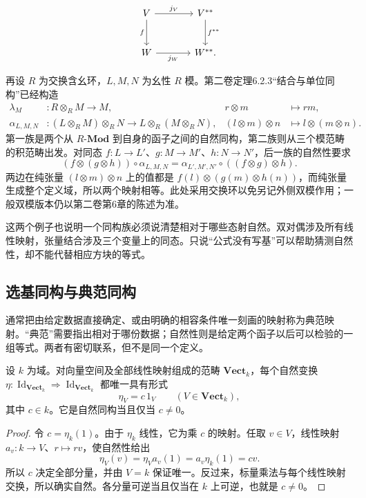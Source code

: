 \[
	\begin{tikzcd}[column sep=large,row sep=large]
		V\arrow[r,"j_V"]\arrow[d,"f"']&V^{**}\arrow[d,"f^{**}"]\\
		W\arrow[r,"j_W"']&W^{**}.
	\end{tikzcd}
\]

再设 \(R\) 为交换含幺环，\(L,M,N\) 为幺性 \(R\) 模。第二卷定理6.2.3“结合与单位同构”已经构造
\[
	\begin{aligned}
		\lambda_M &:R\otimes_RM\longrightarrow M, &r\otimes m&\longmapsto rm,\\
		\alpha_{L,M,N}&:(L\otimes_RM)\otimes_RN \longrightarrow L\otimes_R(M\otimes_RN), &(l\otimes m)\otimes n&\longmapsto l\otimes(m\otimes n).
	\end{aligned}
\]
第一族是两个从 \(R\text{-}\mathbf{Mod}\) 到自身的函子之间的自然同构，第二族则从三个模范畴的积范畴出发。对同态 \(f:L\rightarrow L'\)、\(g:M\rightarrow M'\)、\(h:N\rightarrow N'\)，后一族的自然性要求
\[
	(f\otimes(g\otimes h))\circ\alpha_{L,M,N} =\alpha_{L',M',N'}\circ((f\otimes g)\otimes h).
\]
两边在纯张量 \((l\otimes m)\otimes n\) 上的值都是 \(f(l)\otimes(g(m)\otimes h(n))\)，而纯张量生成整个定义域，所以两个映射相等。此处采用交换环以免另记外侧双模作用；一般双模版本仍以第二卷第6章的陈述为准。

\ProseParagraphBreak
这两个例子也说明一个同构族必须说清楚相对于哪些态射自然。双对偶涉及所有线性映射，张量结合涉及三个变量上的同态。只说“公式没有写基”可以帮助猜测自然性，却不能代替相应方块的等式。

\subsection{选基同构与典范同构}
\label{b4:subsec:0104:02}

通常把由给定数据直接确定、或由明确的相容条件唯一刻画的映射称为典范映射。“典范”需要指出相对于哪份数据；自然性则是给定两个函子以后可以检验的一组等式。两者有密切联系，但不是同一个定义。

\begin{proposition}\label{b4:prop:natural-scalars}
	设 \(k\) 为域。对向量空间及全部线性映射组成的范畴 \(\mathbf{Vect}_k\)，每个自然变换 \(\eta:\operatorname{Id}_{\mathbf{Vect}_k}\Rightarrow\operatorname{Id}_{\mathbf{Vect}_k}\) 都唯一具有形式
	\[
		\eta_V=c\,1_V\qquad(V\in\mathbf{Vect}_k),
	\]
	其中 \(c\in k\)。它是自然同构当且仅当 \(c\ne0\)。
\end{proposition}
\begin{proof}
	令 \(c=\eta_k(1)\)。由于 \(\eta_k\) 线性，它为乘 \(c\) 的映射。任取 \(v\in V\)，线性映射 \(a_v:k\rightarrow V\)、\(r\mapsto rv\)，使自然性给出
	\[
		\eta_V(v)=\eta_Va_v(1)=a_v\eta_k(1)=cv.
	\]
	所以 \(c\) 决定全部分量，并由 \(V=k\) 保证唯一。反过来，标量乘法与每个线性映射交换，所以确实自然。各分量可逆当且仅当在 \(k\) 上可逆，也就是 \(c\ne0\)。
\end{proof}

